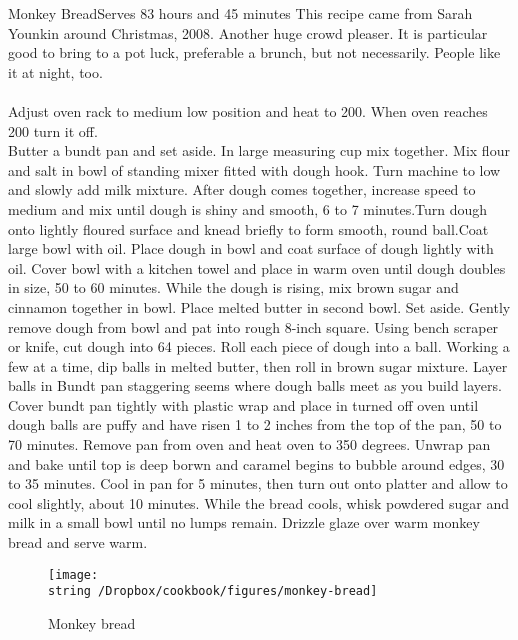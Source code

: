 \begin{recipe}{Monkey Bread}{Serves 8}{3 hours and 45 minutes}
\freeform This recipe came from Sarah Younkin around Christmas, 2008.  Another huge crowd pleaser.  It is particular good to bring to a pot luck, preferable a brunch, but not necessarily.  People like it at night, too.\\\\
Adjust oven rack to medium low position and heat to 200\0.  When oven reaches 200\0 turn it off.\\
Butter a bundt pan and set aside.
In large measuring cup mix together.
Mix flour and salt in bowl of standing mixer fitted with dough hook.
\freeform
Turn machine to low and slowly add milk mixture.  After dough comes
together, increase speed to medium and mix until dough is shiny and
smooth, 6 to 7 minutes.Turn dough onto lightly floured surface and
knead briefly to form smooth, round ball.Coat large bowl with
oil. Place dough in bowl and coat surface of dough lightly with oil.
Cover bowl with a kitchen towel and place in warm oven until dough
doubles in size, 50 to 60 minutes.
While the dough is rising, mix brown sugar and cinnamon together in bowl. Place melted butter in second bowl. Set aside.
\freeform
Gently remove dough from bowl and pat into rough 8-inch square. Using
bench scraper or knife, cut dough into 64 pieces. Roll each piece of
dough into a ball. Working a few at a time, dip balls in melted
butter, then roll in brown sugar mixture. Layer balls in Bundt pan
staggering seems where dough balls meet as you build layers. Cover
bundt pan tightly with plastic wrap and place in turned off oven until
dough balls are puffy and have risen 1 to 2 inches from the top of the
pan, 50 to 70 minutes. Remove pan from oven and heat oven to 350
degrees. Unwrap pan and bake until top is deep borwn and caramel
begins to bubble around edges, 30 to 35 minutes. Cool in pan for 5
minutes, then turn out onto platter and allow to cool slightly, about
10 minutes.
While the bread cools, whisk powdered sugar and milk in a small bowl until no lumps remain. Drizzle glaze over warm monkey bread and serve warm. 
\end{recipe}
\begin{figure}
\begin{center}
\texttt{[image: \\string~/Dropbox/cookbook/figures/monkey-bread]}
\end{center}
\caption*{Monkey bread}
\end{figure}
